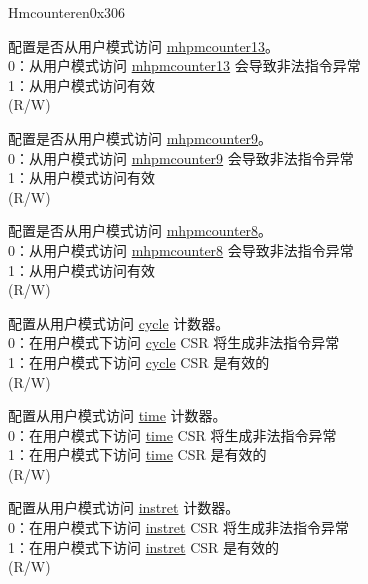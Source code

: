 \begin{register}{H}{mcounteren}{0x306}\label{regdesc:MCOUNTEREN}
%
%
%
%
%
%
%
%
%
\regnewline%
\begin{regdesc}\begin{reglist}
\label{fielddesc:MCOUNTEREN_HPM_13}\item [{HPM13}] 配置是否从用户模式访问 \hyperref[regdesc:MHPMCOUNTER13] {mhpmcounter13}。\\
0：从用户模式访问 \hyperref[regdesc:MHPMCOUNTER13] {mhpmcounter13} 会导致非法指令异常\\
1：从用户模式访问有效\\
(R/W)
\label{fielddesc:MCOUNTEREN_HPM9}\item [{HPM9}] 配置是否从用户模式访问 \hyperref[regdesc:MHPMCOUNTER9] {mhpmcounter9}。\\
0：从用户模式访问 \hyperref[regdesc:MHPMCOUNTER9] {mhpmcounter9} 会导致非法指令异常\\
1：从用户模式访问有效\\
(R/W) 
\label{fielddesc:MCOUNTEREN_HPM_8}\item [{HPM8}] 配置是否从用户模式访问 \hyperref[regdesc:MHPMCOUNTER8] {mhpmcounter8}。\\
0：从用户模式访问 \hyperref[regdesc:MHPMCOUNTER13] {mhpmcounter8} 会导致非法指令异常\\
1：从用户模式访问有效\\
(R/W) 
\label{fielddesc:MCOUNTEREN_CY}\item [CY] 配置从用户模式访问 \hyperref[regdesc:CYCLE]{cycle} 计数器。 \\
0：在用户模式下访问 \hyperref[regdesc:CYCLE]{cycle} CSR 将生成非法指令异常 \\
1：在用户模式下访问 \hyperref[regdesc:CYCLE]{cycle} CSR 是有效的 \\
(R/W) \\
\label{fielddesc:MCOUNTEREN_TM}\item [TM] 配置从用户模式访问 \hyperref[regdesc:TIME]{time} 计数器。 \\
0：在用户模式下访问 \hyperref[regdesc:TIME]{time} CSR 将生成非法指令异常 \\
1：在用户模式下访问 \hyperref[regdesc:TIME]{time} CSR 是有效的\\
(R/W)  \\
\label{fielddesc:MCOUNTEREN_IR}\item [IR] 配置从用户模式访问 \hyperref[regdesc:INSTRET]{instret} 计数器。 \\
0：在用户模式下访问 \hyperref[regdesc:INSTRET]{instret} CSR 将生成非法指令异常\\
1：在用户模式下访问 \hyperref[regdesc:INSTRET]{instret} CSR 是有效的 \\
(R/W) \\
\end{reglist}\end{regdesc}
\end{register}

